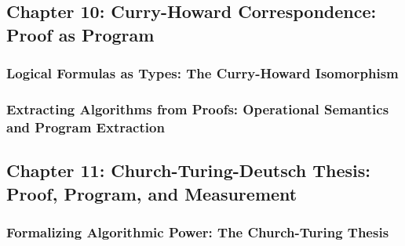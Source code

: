 \hypertarget{chapter-10-curry-howard-correspondence-proof-as-program}{%
\subsection*{Chapter 10: Curry-Howard Correspondence: Proof as
Program}\label{chapter-10-curry-howard-correspondence-proof-as-program}}

\hypertarget{logical-formulas-as-types-the-curry-howard-isomorphism}{%
\subsubsection*{Logical Formulas as Types: The Curry-Howard
Isomorphism}\label{logical-formulas-as-types-the-curry-howard-isomorphism}}

\hypertarget{extracting-algorithms-from-proofs-operational-semantics-and-program-extraction}{%
\subsubsection*{Extracting Algorithms from Proofs: Operational Semantics
and Program
Extraction}\label{extracting-algorithms-from-proofs-operational-semantics-and-program-extraction}}

\hypertarget{chapter-11-church-turing-deutsch-thesis-proof-program-and-measurement}{%
\subsection*{Chapter 11: Church-Turing-Deutsch Thesis: Proof, Program,
and
Measurement}\label{chapter-11-church-turing-deutsch-thesis-proof-program-and-measurement}}

\hypertarget{formalizing-algorithmic-power-the-church-turing-thesis}{%
\subsubsection*{Formalizing Algorithmic Power: The Church-Turing
Thesis}\label{formalizing-algorithmic-power-the-church-turing-thesis}}

